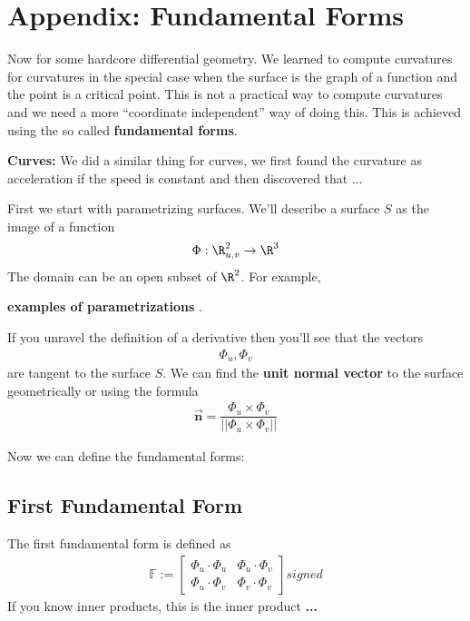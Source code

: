

\section{Appendix: Fundamental Forms}

Now for some hardcore differential geometry. We learned to compute curvatures for curvatures in the special case when the surface is the graph of a function and the point is a critical point. This is not a practical way to compute curvatures and we need a more ``coordinate independent'' way of doing this. This is achieved using the so called \textbf{fundamental forms}.

\textbf{Curves:} We did a similar thing for curves, we first found the curvature as acceleration if the speed is constant and then discovered that ...





First we start with parametrizing surfaces. We'll describe a surface $ S$ as the image of a function
\begin{align*}
  \Phi: \R^2_{u,v} \rightarrow \R^3
\end{align*}
The domain can be an open subset of $ \R^2$. For example,

{\color{red} \textbf{ examples of parametrizations }}.

If you unravel the definition of a derivative then you'll see that the vectors
\begin{align}
  \Phi_{u}, \Phi_{v}
\end{align}
are tangent to the surface $ S$. We can find the \textbf{unit normal vector} to the surface geometrically or using the formula
\begin{align}
  \vec{\mathbf{n}} = \dfrac{\Phi_{u} \times \Phi_{v}}{||\Phi_{u} \times \Phi_{v}||}
\end{align}

Now we can define the fundamental forms:






\subsection{First Fundamental Form}
  The first fundamental form is defined as
  \begin{align}
    \mathbb{F} :=
    \begin{bmatrix}
      \Phi_u \cdot \Phi_u & \Phi_u \cdot \Phi_v \\
      \Phi_u \cdot \Phi_v & \Phi_v \cdot \Phi_v
    \end{bmatrix}signed
  \end{align}
  If you know inner products, this is the inner product {\color{red} \textbf{ ... }}








